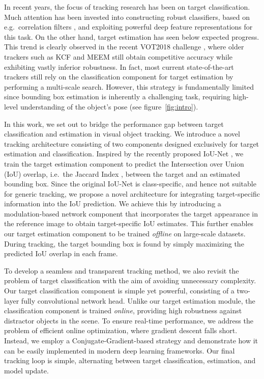 \documentclass[10pt,twocolumn,letterpaper]{article}
\begin{document}
In recent years, the focus of tracking research has been on target classification. Much attention has been invested into constructing robust classifiers, based on e.g.\ correlation filters \cite{DanelljanICCV2015, CSRDCF, DRT}, and exploiting powerful deep feature representations \cite{BhatECCV2018, Valmadre2017cvpr} for this task. On the other hand, target estimation has seen below expected progress. This trend is clearly observed in the recent VOT2018 challenge \cite{VOT2018}, where older trackers such as KCF \cite{Henriques14} and MEEM \cite{MEEM2014} still obtain competitive accuracy while exhibiting vastly inferior robustness. In fact, most current state-of-the-art trackers \cite{BhatECCV2018, DanelljanCVPR2017, DRT} still rely on the classification component for target estimation by performing a multi-scale search. However, this strategy is fundamentally limited since bounding box estimation is inherently a challenging task, requiring high-level understanding of the object's pose (see figure~\ref{fig:intro}). 

In this work, we set out to bridge the performance gap between target classification and estimation in visual object tracking. We introduce a novel tracking architecture consisting of two components designed exclusively for target estimation and classification. Inspired by the recently proposed IoU-Net \cite{IOUNet}, we train the target estimation component to predict the Intersection over Union (IoU) overlap, i.e.\ the Jaccard Index \cite{JaccardIndex}, between the target and an estimated bounding box. Since the original IoU-Net is class-specific, and hence not suitable for generic tracking, we propose a novel architecture for integrating target-specific information into the IoU prediction. We achieve this by introducing a modulation-based network component that incorporates the target appearance in the reference image to obtain target-specific IoU estimates. This further enables our target estimation component to be trained \emph{offline} on large-scale datasets. During tracking, the target bounding box is found by simply maximizing the predicted IoU overlap in each frame.

To develop a seamless and transparent tracking method, we also revisit the problem of target classification with the aim of avoiding unnecessary complexity. 
Our target classification component is simple yet powerful, consisting of a two-layer fully convolutional network head. Unlike our target estimation module, the classification component is trained \emph{online}, providing high robustness against distractor objects in the scene. To ensure real-time performance, we address the problem of efficient online optimization, where gradient descent falls short. Instead, we employ a Conjugate-Gradient-based strategy and demonstrate how it can be easily implemented in modern deep learning frameworks. Our final tracking loop is simple, alternating between target classification, estimation, and model update.
\end{document}
